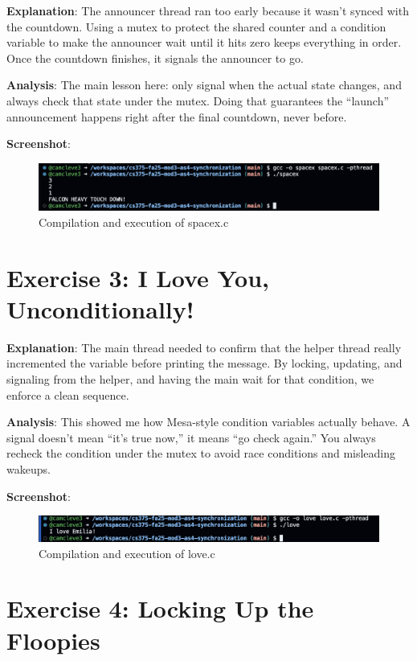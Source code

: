 \documentclass{article}
\begin{document}
\textbf{Explanation}:  
The announcer thread ran too early because it wasn’t synced with the countdown. Using a mutex to protect the shared counter and a condition variable to make the announcer wait until it hits zero keeps everything in order. Once the countdown finishes, it signals the announcer to go.

\textbf{Analysis}:  
The main lesson here: only signal when the actual state changes, and always check that state under the mutex. Doing that guarantees the “launch” announcement happens right after the final countdown, never before.

\textbf{Screenshot}:
\begin{figure}[h]
  \centering
  \includegraphics[width=\textwidth]{pic2.png}
  \caption{Compilation and execution of spacex.c}
\end{figure}

\section{Exercise 3: I Love You, Unconditionally!}


\textbf{Explanation}:  
The main thread needed to confirm that the helper thread really incremented the variable before printing the message. By locking, updating, and signaling from the helper, and having the main wait for that condition, we enforce a clean sequence.

\textbf{Analysis}:  
This showed me how Mesa-style condition variables actually behave. A signal doesn’t mean “it’s true now,” it means “go check again.” You always recheck the condition under the mutex to avoid race conditions and misleading wakeups.

\textbf{Screenshot}:
\begin{figure}[h]
  \centering
  \includegraphics[width=\textwidth]{pic3.png}
  \caption{Compilation and execution of love.c}
\end{figure}

\section{Exercise 4: Locking Up the Floopies}

\end{document}
